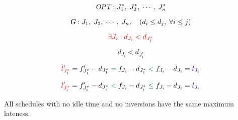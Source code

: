 \begin{frame}{}
  \begin{quote}
    \centering
    {\Large {}}
  \end{quote}

\end{frame}

\begin{frame}{}
  \begin{center}
  \end{center}

  \[
    \textsl{OPT}: J_{1}^{\ast},\; J_{2}^{\ast},\; \cdots,\; J_{n}^{\ast}
  \]

  \[
    \textsl{G}: J_1,\; J_2,\; \cdots,\; J_n, \quad (d_i \le d_j,\; \forall i \le j)
  \]

  \[
    \textcolor{red}{\exists J_i: d_{J_i} < d_{J_{1}^{\ast}}}
  \]
\end{frame}

\begin{frame}{}
  \[
    d_{J_i} < d_{J_{1}^{\ast}}
  \]


  \pause
  \[
    \textcolor{red}{l'_{J_{1}^{\ast}}} = f'_{J_{1}^{\ast}} - d_{J_{1}^{\ast}} \;\textcolor{teal}{=}\; f_{J_{i}} - d_{J_{1}^{\ast}} \;\textcolor{teal}{<}\; f_{J_{i}} - d_{J_{i}} = \textcolor{blue}{l_{J_{i}}}
  \]

  \pause
  \[
    \textcolor{red}{l'_{J_{i}^{\ast}}} = f'_{J_{i}^{\ast}} - d_{J_{i}^{\ast}} \;\textcolor{teal}{<}\; f_{J_{i}} - d_{J_{i}^{\ast}} \;\textcolor{teal}{\le}\; f_{J_{i}} - d_{J_{i}} = \textcolor{blue}{l_{J_{i}}}
  \]
\end{frame}

\begin{frame}{}
  \begin{theorem}
    All schedules with no idle time and no inversions have the same maximum lateness.
  \end{theorem}
\end{frame}

